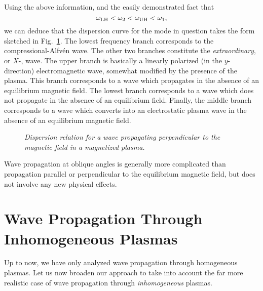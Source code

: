 Using the above information, and the easily demonstrated fact that
\begin{equation}
\omega_{\rm LH} < \omega_2 < \omega_{\rm UH} < \omega_1,
\end{equation}
we can deduce that the dispersion curve for the mode in question 
takes the form sketched in Fig.~\ref{f16}.
The lowest frequency branch corresponds to the compressional-Alfv\'{e}n wave.
The other two branches constitute the {\em extraordinary}, or $X$-, wave.
The upper branch is basically a linearly polarized (in the $y$-direction)
 electromagnetic wave, somewhat modified by the presence of the plasma. This 
branch corresponds to a wave which 
propagates in the absence of an equilibrium magnetic field. The lowest 
branch corresponds to a wave which does not propagate in the absence of an
equilibrium field. Finally, the middle branch corresponds to a wave which
converts into an electrostatic plasma wave in the absence of an equilibrium
magnetic field.

\begin{figure}
\epsfysize=4in
\centerline{}
\caption{\em Dispersion relation for a wave propagating perpendicular to the
magnetic field in a magnetized plasma.}\label{f16}
\end{figure}

Wave propagation at oblique angles is generally more complicated than
propagation parallel or perpendicular to the equilibrium magnetic field,
but does not involve any new physical effects. 

\section{Wave Propagation Through Inhomogeneous Plasmas}\label{s4.11}
Up to now, we have only analyzed  wave propagation through
homogeneous plasmas. Let us now broaden our approach to take into
account the far more realistic case of wave propagation through
{\em inhomogeneous}\/ plasmas. 

